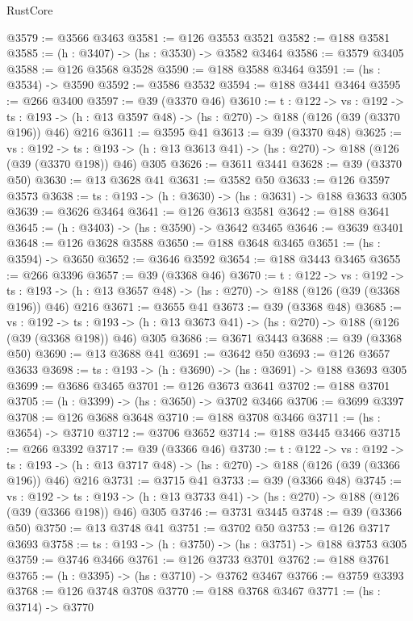 \begin{lexlean}{RustCore}
\begin{coremodule}
@3579 := @3566 @3463
@3581 := @126 @3553 @3521
@3582 := @188 @3581
@3585 := (h : @3407) -> (hs : @3530) -> @3582 @3464
@3586 := @3579 @3405
@3588 := @126 @3568 @3528
@3590 := @188 @3588 @3464
@3591 := (hs : @3534) -> @3590
@3592 := @3586 @3532
@3594 := @188 @3441 @3464
@3595 := @266 @3400
@3597 := @39 (@3370 @46)
@3610 := {t : @122} ->
  {vs : @192} ->
  {ts : @193} -> (h : @13 @3597 @48) -> (hs : @270) -> @188 (@126 (@39 (@3370 @196)) @46) @216
@3611 := @3595 @41
@3613 := @39 (@3370 @48)
@3625 := {vs : @192} ->
  {ts : @193} -> (h : @13 @3613 @41) -> (hs : @270) -> @188 (@126 (@39 (@3370 @198)) @46) @305
@3626 := @3611 @3441
@3628 := @39 (@3370 @50)
@3630 := @13 @3628 @41
@3631 := @3582 @50
@3633 := @126 @3597 @3573
@3638 := {ts : @193} -> (h : @3630) -> (hs : @3631) -> @188 @3633 @305
@3639 := @3626 @3464
@3641 := @126 @3613 @3581
@3642 := @188 @3641
@3645 := (h : @3403) -> (hs : @3590) -> @3642 @3465
@3646 := @3639 @3401
@3648 := @126 @3628 @3588
@3650 := @188 @3648 @3465
@3651 := (hs : @3594) -> @3650
@3652 := @3646 @3592
@3654 := @188 @3443 @3465
@3655 := @266 @3396
@3657 := @39 (@3368 @46)
@3670 := {t : @122} ->
  {vs : @192} ->
  {ts : @193} -> (h : @13 @3657 @48) -> (hs : @270) -> @188 (@126 (@39 (@3368 @196)) @46) @216
@3671 := @3655 @41
@3673 := @39 (@3368 @48)
@3685 := {vs : @192} ->
  {ts : @193} -> (h : @13 @3673 @41) -> (hs : @270) -> @188 (@126 (@39 (@3368 @198)) @46) @305
@3686 := @3671 @3443
@3688 := @39 (@3368 @50)
@3690 := @13 @3688 @41
@3691 := @3642 @50
@3693 := @126 @3657 @3633
@3698 := {ts : @193} -> (h : @3690) -> (hs : @3691) -> @188 @3693 @305
@3699 := @3686 @3465
@3701 := @126 @3673 @3641
@3702 := @188 @3701
@3705 := (h : @3399) -> (hs : @3650) -> @3702 @3466
@3706 := @3699 @3397
@3708 := @126 @3688 @3648
@3710 := @188 @3708 @3466
@3711 := (hs : @3654) -> @3710
@3712 := @3706 @3652
@3714 := @188 @3445 @3466
@3715 := @266 @3392
@3717 := @39 (@3366 @46)
@3730 := {t : @122} ->
  {vs : @192} ->
  {ts : @193} -> (h : @13 @3717 @48) -> (hs : @270) -> @188 (@126 (@39 (@3366 @196)) @46) @216
@3731 := @3715 @41
@3733 := @39 (@3366 @48)
@3745 := {vs : @192} ->
  {ts : @193} -> (h : @13 @3733 @41) -> (hs : @270) -> @188 (@126 (@39 (@3366 @198)) @46) @305
@3746 := @3731 @3445
@3748 := @39 (@3366 @50)
@3750 := @13 @3748 @41
@3751 := @3702 @50
@3753 := @126 @3717 @3693
@3758 := {ts : @193} -> (h : @3750) -> (hs : @3751) -> @188 @3753 @305
@3759 := @3746 @3466
@3761 := @126 @3733 @3701
@3762 := @188 @3761
@3765 := (h : @3395) -> (hs : @3710) -> @3762 @3467
@3766 := @3759 @3393
@3768 := @126 @3748 @3708
@3770 := @188 @3768 @3467
@3771 := (hs : @3714) -> @3770

\end{coremodule}
\end{lexlean}
